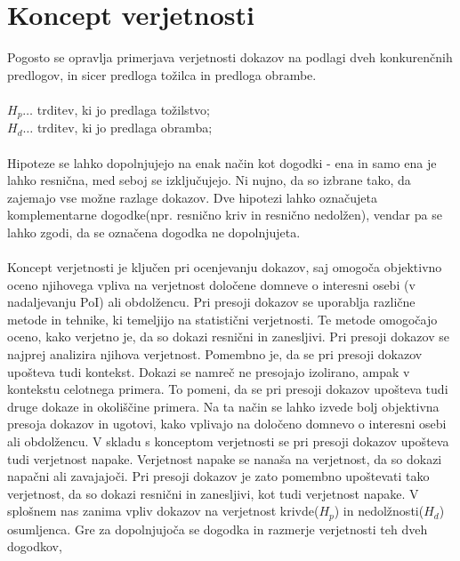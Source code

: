 \documentclass[12pt,a4paper]{amsart}
\theoremstyle{definition} %
\theoremstyle{plain} %
\begin{document}
\section{Koncept verjetnosti}
Pogosto se opravlja primerjava verjetnosti dokazov na podlagi dveh konkurenčnih predlogov, in sicer predloga tožilca in predloga obrambe.\\\\
$H_p \dots$ trditev, ki jo predlaga tožilstvo;\\
$H_d \dots$ trditev, ki jo predlaga obramba;\\\\
Hipoteze se lahko dopolnjujejo na enak način kot dogodki - ena in samo ena je lahko resnična, med seboj se izključujejo. Ni nujno, da so izbrane 
tako, da zajemajo vse možne razlage dokazov. Dve hipotezi lahko označujeta komplementarne dogodke(npr. resnično kriv in resnično nedolžen), 
vendar pa se lahko zgodi, da se označena dogodka ne dopolnjujeta. \\\\
Koncept verjetnosti je ključen pri ocenjevanju dokazov, saj omogoča objektivno oceno njihovega vpliva na verjetnost določene domneve o interesni 
osebi (v nadaljevanju PoI) ali obdolžencu. Pri presoji dokazov se uporablja različne metode in tehnike, ki temeljijo na statistični verjetnosti. 
Te metode omogočajo oceno, kako verjetno je, da so dokazi resnični in zanesljivi. Pri presoji dokazov se najprej analizira njihova verjetnost. Pomembno je, 
da se pri presoji dokazov upošteva tudi kontekst. Dokazi se namreč ne presojajo izolirano, ampak v kontekstu celotnega primera. To pomeni, da se 
pri presoji dokazov upošteva tudi druge dokaze in okoliščine primera. Na ta način se lahko izvede bolj objektivna presoja dokazov in ugotovi, kako 
vplivajo na določeno domnevo o interesni osebi ali obdolžencu. V skladu s konceptom verjetnosti se pri presoji dokazov upošteva tudi verjetnost napake. 
Verjetnost napake se nanaša na verjetnost, da so dokazi napačni ali zavajajoči. Pri presoji dokazov je zato pomembno upoštevati tako verjetnost, da 
so dokazi resnični in zanesljivi, kot tudi verjetnost napake. V splošnem nas zanima vpliv dokazov na verjetnost krivde($H_p$) in
nedolžnosti($H_d$) osumljenca. Gre za dopolnjujoča se dogodka in razmerje verjetnosti teh dveh dogodkov,
\end{document}
